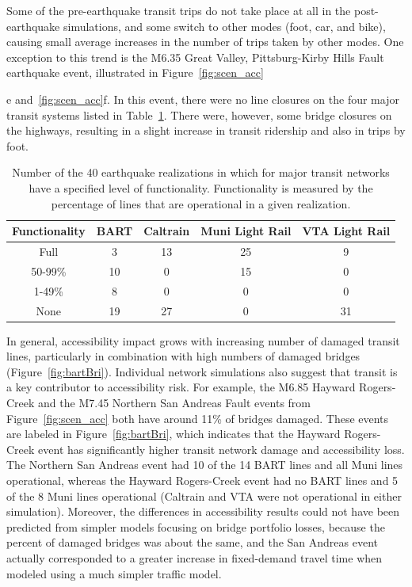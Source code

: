 Some of the pre-earthquake transit trips do not take place at all in the post-earthquake simulations, and some switch to other modes (foot, car, and bike), causing small average increases in the number of trips taken by other modes. One exception to this trend is the M6.35 Great Valley, Pittsburg-Kirby Hills Fault earthquake event, illustrated in Figure~\ref{fig:scen_acc}{e and~\ref{fig:scen_acc}{f}. In this event, there were no line closures on the four major transit systems listed in Table~\ref{tab:transit}. There were, however, some bridge closures on the highways, resulting in a slight increase in transit ridership and also in trips by foot.

\begin{table}
\caption{Number of the 40 earthquake realizations in which for major transit networks have a specified level of functionality. Functionality is measured by the percentage of lines that are operational in a given realization. }
\centering
\begin{tabular}{c||c|c|c|c}
\textbf{Functionality}           & \textbf{BART} & \textbf{Caltrain} & \textbf{Muni Light Rail} & \textbf{VTA Light Rail}  \\
\hline
Full & 3 & 13 & 25 & 9\\
50-99\%  & 10 & 0 & 15 & 0\\
1-49\%  & 8 & 0 & 0 & 0\\
None & 19 & 27 & 0 & 31\\
\end{tabular}
\label{tab:transit}
\end{table}



In general, accessibility impact grows with increasing number of damaged transit lines, particularly in combination with high numbers of damaged bridges (Figure~\ref{fig:bartBri}). Individual network simulations also suggest that transit is a key contributor to accessibility risk. For example, the M6.85 Hayward Rogers-Creek and the M7.45 Northern San Andreas Fault events from Figure~\ref{fig:scen_acc} both have around 11\% of bridges damaged. These events are labeled in Figure~\ref{fig:bartBri}, which indicates that the Hayward Rogers-Creek event has significantly higher transit network damage and accessibility loss. The Northern San Andreas event had 10 of the 14 BART lines and all Muni lines operational, whereas the Hayward Rogers-Creek event had no BART lines and 5 of the 8 Muni lines operational (Caltrain and VTA were not operational in either simulation).  
Moreover, the differences in accessibility results could not have been predicted from simpler models focusing on bridge portfolio losses, because the percent of damaged bridges was about the same, and the San Andreas event actually corresponded to a greater increase in fixed-demand travel time when modeled using a much simpler traffic model.

}
